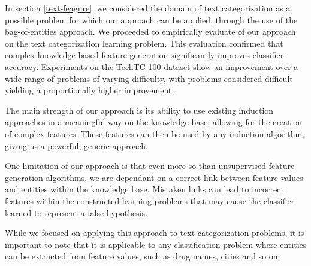 \documentclass[twoside,11pt]{article}
\theoremstyle{definition}
\begin{document}
In section \ref{text-feagure}, we considered the domain of text categorization as a possible problem for which our approach can be applied, through the use of the bag-of-entities approach. We proceeded to empirically evaluate of our approach on the text categorization learning problem.
This evaluation confirmed that complex knowledge-based feature generation significantly improves classifier accuracy. Experiments on the TechTC-100 dataset show an improvement over a wide range of problems of varying difficulty, with problems considered difficult yielding a proportionally higher improvement.

The main strength of our approach is its ability to use existing induction approaches in a meaningful way on the knowledge base, allowing for the creation of complex features. These features can then be used by any induction algorithm, giving us a powerful, generic approach.

One limitation of our approach is that even more so than unsupervised feature generation algorithms,  we are dependant on a correct link between feature values and entities within the knowledge base. Mistaken links can lead to incorrect features within the constructed learning problems that may cause the classifier learned to represent a false hypothesis. 

While we focused on applying this approach to text categorization problems, it is important to note that it is applicable to any classification problem where entities can be extracted from feature values, such as drug names, cities and so on. 

\clearpage
\vskip 0.2in


\end{document}
